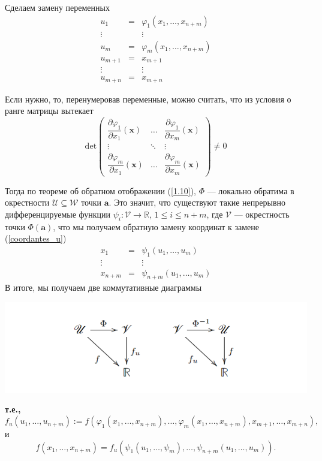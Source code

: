\documentclass[a4paper]{article}
\newcommand{\m}[1]{\mathbf{#1}}
\begin{document}
Сделаем замену переменных
\begin{equation}\label{coordantes_u}
\begin{matrix}
u_1 & = & \varphi_1(x_1,\ldots, x_{n+m}) \\
\vdots & & \vdots\\
u_m & = & \varphi_m(x_1,\ldots, x_{n+m}) \\
u_{m+1} &=& x_{m+1} \\
\vdots && \vdots \\
u_{m+n} &=& x_{m+n}
\end{matrix}
\end{equation}

Если нужно, то, перенумеровав переменные, можно считать, что из условия о ранге матрицы вытекает
$$
\mathrm{det} \begin{pmatrix}
\dfrac{\partial \varphi_1}{\partial x_{1}}(\m{x}) &\ldots& \dfrac{\partial \varphi_1}{\partial x_{m}}(\m{x}) \\
\vdots & \ddots & \vdots \\
\dfrac{\partial \varphi_m}{\partial x_{1}}(\m{x}) &\ldots & \dfrac{\partial \varphi_m}{\partial x_{m}}(\m{x})
\end{pmatrix} \ne 0
$$

Тогда по теореме об обратном отображении (\ref{1.10}), $\Phi$ — локально обратима в окрестности $\mathscr{U} \subseteq \mathscr{W}$ точки $\m{a}.$ Это значит, что существуют такие непрерывно дифференцируемые функции $\psi_i: \mathscr{V} \to \mathbb{R}$, $1\le i \le n+m$, где $\mathscr{V}$ — окрестность точки $\Phi(\m{a})$, что мы получаем обратную замену координат к замене (\ref{coordantes_u}) 
$$
\begin{matrix}
x_1 & = & \psi_1(u_1,\ldots, u_{m}) \\
\vdots & & \vdots\\
x_{n+m} & = & \psi_{n+m}(u_1,\ldots, u_m)
\end{matrix}
$$\newpage
В итоге, мы получаем две коммутативные диаграммы
\begin{center}
    \includegraphics[width=0.5\linewidth]{image-4.png}
\end{center}
\textbf{т.е.,}
$$
f_u(u_1, \ldots, u_{n+m}) := f(\varphi_1(x_1,\ldots, x_{n+m}), \ldots, \varphi_m(x_1,\ldots, x_{n+m}), x_{m+1},\ldots, x_{m+n}),
$$
и
$$
f(x_1,\ldots, x_{n+m})= f_u(\psi_1(u_1,\ldots, \psi_m), \ldots, \psi_{n+m}(u_1,\ldots, u_m)).
$$
\end{document}
